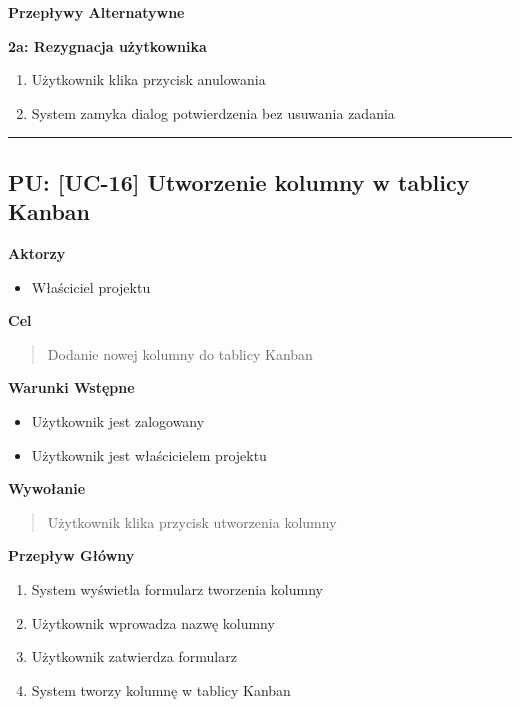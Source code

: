 \vspace{0.2cm}
\noindent\textbf{Przepływy Alternatywne}

\textbf{2a: Rezygnacja użytkownika}
\begin{enumerate}
    \item Użytkownik klika przycisk anulowania
    \item System zamyka dialog potwierdzenia bez usuwania zadania
\end{enumerate}


\hrule
\vspace{1cm}

\subsection*{PU: [UC-16] Utworzenie kolumny w tablicy Kanban}

\noindent\textbf{Aktorzy}
\begin{itemize}
    \item Właściciel projektu
\end{itemize}

\vspace{0.2cm}
\noindent\textbf{Cel}
\begin{quote}
    Dodanie nowej kolumny do tablicy Kanban
\end{quote}

\vspace{0.2cm}
\noindent\textbf{Warunki Wstępne}
\begin{itemize}
    \item Użytkownik jest zalogowany
    \item Użytkownik jest właścicielem projektu
\end{itemize}

\vspace{0.2cm}
\noindent\textbf{Wywołanie}
\begin{quote}
    Użytkownik klika przycisk utworzenia kolumny
\end{quote}

\vspace{0.2cm}
\noindent\textbf{Przepływ Główny}
\begin{enumerate}
    \item System wyświetla formularz tworzenia kolumny
    \item Użytkownik wprowadza nazwę kolumny
    \item Użytkownik zatwierdza formularz
    \item System tworzy kolumnę w tablicy Kanban
\end{enumerate}

